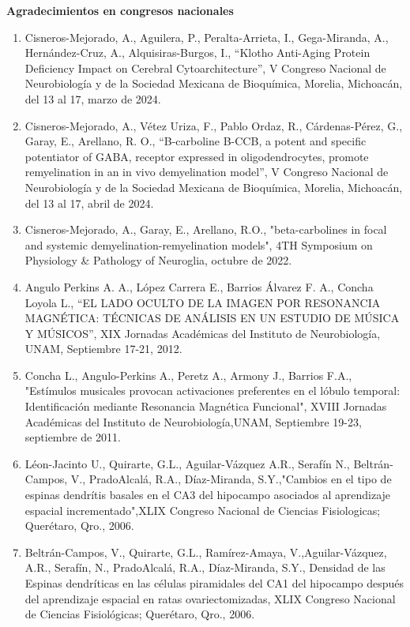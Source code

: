 \textbf{Agradecimientos en congresos nacionales}

\begin{enumerate}
\item Cisneros-Mejorado, A., Aguilera, P., Peralta-Arrieta, I., Gega-Miranda, A., Hernández-Cruz, A., Alquisiras-Burgos, I., 
“Klotho Anti-Aging Protein Deficiency Impact on Cerebral Cytoarchitecture”, V Congreso Nacional de Neurobiología y de la 
Sociedad Mexicana de Bioquímica, Morelia, Michoacán, del 13 al 17, marzo de 2024.

\item  Cisneros-Mejorado, A., Vétez Uriza, F., Pablo Ordaz, R., Cárdenas-Pérez, G., Garay, E., Arellano,
R. O., “B-carboline B-CCB, a potent and specific potentiator of GABA, receptor expressed in oligodendrocytes, promote 
remyelination in an in vivo demyelination model”, V Congreso Nacional de Neurobiología y de la Sociedad Mexicana de 
Bioquímica, Morelia, Michoacán, del 13 al 17, abril de 2024.

\item  Cisneros-Mejorado, A., Garay, E., Arellano, R.O., "beta-carbolines in focal and systemic demyelination-remyelination 
models", 4TH Symposium on Physiology & Pathology of Neuroglia, octubre de 2022.

\item  Angulo Perkins A. A., López Carrera E., Barrios Álvarez F. A., Concha Loyola L., “EL LADO OCULTO DE LA IMAGEN POR 
RESONANCIA MAGNÉTICA: TÉCNICAS DE ANÁLISIS EN UN ESTUDIO DE MÚSICA Y MÚSICOS”, XIX Jornadas Académicas del Instituto de 
Neurobiología, UNAM, Septiembre 17-21, 2012.

\item  Concha L., Angulo-Perkins A., Peretz A., Armony J., Barrios F.A., "Estímulos musicales provocan activaciones 
preferentes 
en el lóbulo temporal: Identificación mediante Resonancia Magnética Funcional", XVIII Jornadas Académicas del Instituto de 
Neurobiología,UNAM, Septiembre 19-23, septiembre de 2011.

\item  Léon-Jacinto U., Quirarte, G.L., Aguilar-Vázquez A.R., Serafín N., Beltrán-Campos, V., PradoAlcalá, R.A., 
Díaz-Miranda, 
S.Y.,"Cambios en el tipo de espinas dendrítis basales en el CA3 del hipocampo asociados al aprendizaje espacial 
incrementado",XLIX Congreso Nacional de Ciencias Fisiologicas; Querétaro, Qro., 2006.

\item  Beltrán-Campos, V., Quirarte, G.L., Ramírez-Amaya, V.,Aguilar-Vázquez, A.R., Serafín, N., PradoAlcalá, R.A., 
Díaz-Miranda, 
S.Y., Densidad de las Espinas dendríticas en las células piramidales del CA1 del hipocampo después del aprendizaje espacial 
en ratas ovariectomizadas, XLIX Congreso Nacional de Ciencias Fisiológicas; Querétaro, Qro., 2006.


\end{enumerate}
